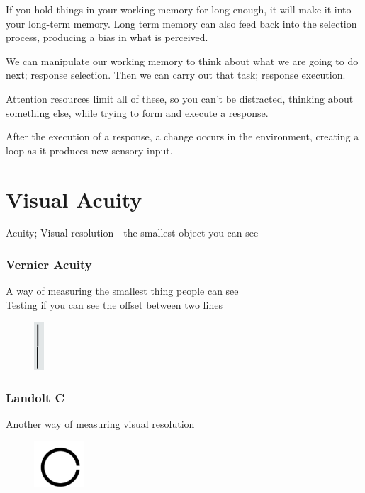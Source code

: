 \documentclass[]{project_plan}
\begin{document}
If you hold things in your working memory for long enough, it will make it into
your long-term memory. Long term memory can also feed back into the selection
process, producing a bias in what is perceived.

We can manipulate our working memory to think about what we are going to do next;
response selection. Then we can carry out that task; response execution.

Attention resources limit all of these, so you can't be distracted,
thinking about something else, while trying to form and execute a response.

After the execution of a response, a change occurs in the environment, creating a
loop as it produces new sensory input.

\section{Visual Acuity}
Acuity; Visual resolution - the smallest object you can see

\subsubsection{Vernier Acuity}
A way of measuring the smallest thing people can see\\
Testing if you can see the offset between two lines
\begin{figure}[h!]
  \centering
  \includegraphics[width=1em]{vernier_acuity.png}
\end{figure}

\subsubsection{Landolt C}
Another way of measuring visual resolution
\begin{figure}[h!]
  \centering
  \includegraphics[width=5em]{landolt_c.png}
\end{figure}
\end{document}

